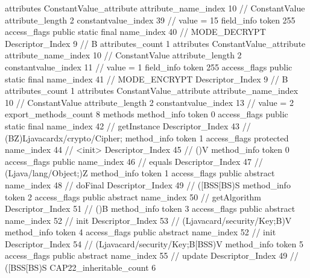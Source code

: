 {{{{{				attributes {
				ConstantValue_attribute {
					attribute_name_index	10		// ConstantValue
					attribute_length	2
					constantvalue_index	39		// value = 15
				}
				}
			}
			field_info {
				token	255
				access_flags	public static final
				name_index	40		// MODE_DECRYPT
				Descriptor_Index	9		// B
				attributes_count	1
				attributes {
				ConstantValue_attribute {
					attribute_name_index	10		// ConstantValue
					attribute_length	2
					constantvalue_index	11		// value = 1
				}
				}
			}
			field_info {
				token	255
				access_flags	public static final
				name_index	41		// MODE_ENCRYPT
				Descriptor_Index	9		// B
				attributes_count	1
				attributes {
				ConstantValue_attribute {
					attribute_name_index	10		// ConstantValue
					attribute_length	2
					constantvalue_index	13		// value = 2
				}
				}
			}
			}
			export_methods_count	8
			methods {
				method_info {
					token	0
					access_flags	public static final
					name_index	42		// getInstance
					Descriptor_Index	43		// (BZ)Ljavacardx/crypto/Cipher;
				}
				method_info {
					token	1
					access_flags	protected
					name_index	44		// <init>
					Descriptor_Index	45		// ()V
				}
				method_info {
					token	0
					access_flags	public
					name_index	46		// equals
					Descriptor_Index	47		// (Ljava/lang/Object;)Z
				}
				method_info {
					token	1
					access_flags	public abstract
					name_index	48		// doFinal
					Descriptor_Index	49		// ([BSS[BS)S
				}
				method_info {
					token	2
					access_flags	public abstract
					name_index	50		// getAlgorithm
					Descriptor_Index	51		// ()B
				}
				method_info {
					token	3
					access_flags	public abstract
					name_index	52		// init
					Descriptor_Index	53		// (Ljavacard/security/Key;B)V
				}
				method_info {
					token	4
					access_flags	public abstract
					name_index	52		// init
					Descriptor_Index	54		// (Ljavacard/security/Key;B[BSS)V
				}
				method_info {
					token	5
					access_flags	public abstract
					name_index	55		// update
					Descriptor_Index	49		// ([BSS[BS)S
				}
			}
			CAP22_inheritable_count	6
		}
	}
}
